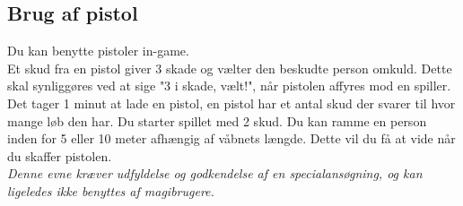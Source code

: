 \subsection{Brug af pistol}\label{Evne:Pistol}
Du kan benytte pistoler in-game.\\
Et skud fra en pistol giver 3 skade og vælter den beskudte person omkuld. Dette skal synliggøres ved at sige "3 i skade, vælt!", når pistolen affyres mod en spiller.\\
Det tager 1 minut at lade en pistol, en pistol har et antal skud der svarer til hvor mange løb den har. Du starter spillet med 2 skud. Du kan ramme en person inden for 5 eller 10 meter afhængig af våbnets længde. Dette vil du få at vide når du skaffer pistolen.\\
\emph{Denne evne kræver udfyldelse og godkendelse af en specialansøgning, og kan ligeledes ikke benyttes af magibrugere.}\\